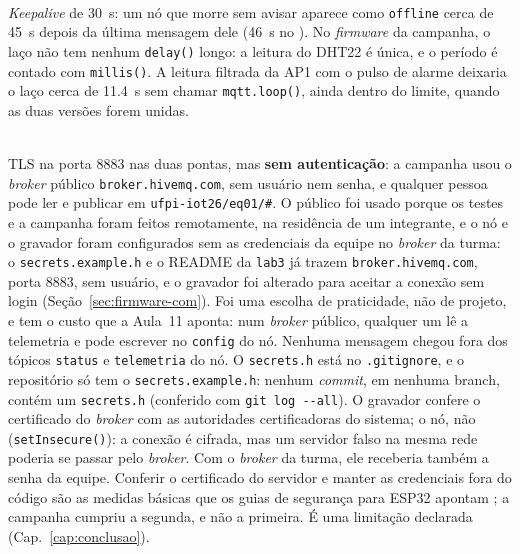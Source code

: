 \begin{description}[style=unboxed, leftmargin=0pt, font=\normalfont\bfseries]
  \item[3. Keepalive e testamento.]\hfill\\
    \emph{Keepalive} de \SI{30}{\second}: um nó que morre sem avisar
    aparece como \texttt{offline} cerca de \SI{45}{\second} depois da
    última mensagem dele (\SI{46}{\second} no ). No
    \emph{firmware} da campanha, o laço não tem nenhum \texttt{delay()}
    longo: a leitura do DHT22 é única, e o período é contado com
    \texttt{millis()}. A leitura filtrada da AP1 com o pulso de alarme
    deixaria o laço cerca de \SI{11,4}{\second} sem chamar
    \texttt{mqtt.loop()}, ainda dentro do limite, quando as duas versões
    forem unidas.
  \item[4. Segurança mínima.]\hfill\\
    TLS na porta 8883 nas duas pontas, mas \textbf{sem autenticação}: a
    campanha usou o \emph{broker} público \texttt{broker.hivemq.com}, sem
    usuário nem senha, e qualquer pessoa pode ler e publicar em
    \texttt{ufpi-iot26/eq01/\#}. O público foi usado porque os testes e a
    campanha foram feitos remotamente, na residência de um integrante,
    e o nó e o gravador foram configurados sem as credenciais da equipe
    no \emph{broker} da turma: o \texttt{secrets.example.h} e o README da
    \texttt{lab3} já trazem \texttt{broker.hivemq.com}, porta 8883, sem
    usuário, e o gravador foi alterado para aceitar a conexão sem login
    (Seção~\ref{sec:firmware-com}). Foi uma escolha de praticidade, não
    de projeto, e tem o custo que a Aula~11 aponta: num \emph{broker}
    público, qualquer um lê a telemetria e pode escrever no
    \texttt{config} do nó. Nenhuma mensagem chegou fora dos tópicos
    \texttt{status} e \texttt{telemetria} do nó. O \texttt{secrets.h}
    está no \texttt{.gitignore}, e o repositório só tem o
    \texttt{secrets.example.h}: nenhum \emph{commit}, em nenhuma branch,
    contém um \texttt{secrets.h} (conferido com \texttt{git log -{}-all}).
    O gravador confere o certificado do \emph{broker} com as autoridades
    certificadoras do sistema; o nó, não (\texttt{setInsecure()}): a
    conexão é cifrada, mas um servidor falso na mesma rede poderia se
    passar pelo \emph{broker}. Com o \emph{broker} da turma, ele
    receberia também a senha da equipe. Conferir o certificado do
    servidor e manter as credenciais fora do código são as medidas
    básicas que os guias de segurança para ESP32 apontam
    \cite{wavtron2025iotsecurity}; a campanha cumpriu a segunda, e não
    a primeira. É uma limitação declarada
    (Cap.~\ref{cap:conclusao}).
\end{description}

